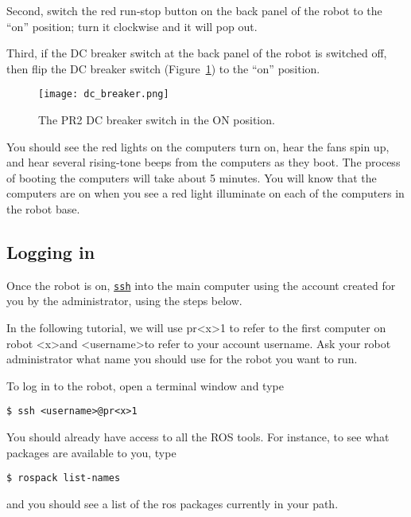 Second, switch the red run-stop button on the back panel of the robot to the ``on'' position; turn it clockwise and it will pop out.

Third, if the DC breaker switch at the back panel of the robot is switched off, then flip the DC breaker switch (Figure~\ref{fig:dc_breaker}) to the ``on'' position.

\begin{figure}[h]
\centering
\texttt{[image: dc\_breaker.png]}
\caption{The PR2 DC breaker switch in the ON position.}
\label{fig:dc_breaker}
\end{figure}

You should see the red lights on the computers turn on, hear the fans spin up, and hear several rising-tone beeps from the computers 
as they boot.  The process of booting the computers will take about 5 minutes.  You will know that the computers are on when you see a red light illuminate on each of the computers in the robot base.  
\subsection{Logging in}
Once the robot is on, \texttt{\href{http://unixhelp.ed.ac.uk/CGI/man-cgi?ssh}{ssh}} into the main computer using the account 
created for you by the administrator, using the steps below.

In the following tutorial, we will use pr\textless x\textgreater 1 to refer to the first computer on robot \textless x\textgreater and \textless username\textgreater to refer to your account username.
Ask your robot  administrator what name you should use for the robot you want to run. 

To log in to the robot, open a terminal window and type
\begin{verbatim}
$ ssh <username>@pr<x>1
\end{verbatim}
You should already have access to all the ROS tools. For instance, to see what packages are available to you, type
\begin{verbatim}
$ rospack list-names
\end{verbatim}
and you should see a list of the ros packages currently in your path.

